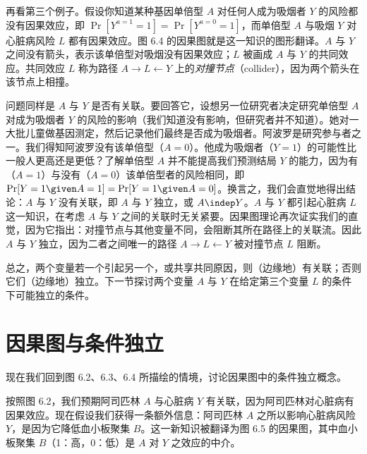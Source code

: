 再看第三个例子。假设你知道某种基因单倍型 $A$ 对任何人成为吸烟者 $Y$ 的风险都没有因果效应，即 $\Pr[Y^{a=1}=1]=\Pr[Y^{a=0}=1]$，而单倍型 $A$ 与吸烟 $Y$ 对心脏病风险 $L$ 都有因果效应。图 6.4 的因果图就是这一知识的图形翻译。$A$ 与 $Y$ 之间没有箭头，表示该单倍型对吸烟没有因果效应；$L$ 被画成 $A$ 与 $Y$ 的共同效应。共同效应 $L$ 称为路径 $A\to L\leftarrow Y$ 上的\emph{对撞节点}（collider），因为两个箭头在该节点上相撞。

\begin{figure}[htbp]
\centering
{}
\caption{}
\label{fig:6.4}
\end{figure}

问题同样是 $A$ 与 $Y$ 是否有关联。要回答它，设想另一位研究者决定研究单倍型 $A$ 对成为吸烟者 $Y$ 的风险的影响（我们知道没有影响，但研究者并不知道）。她对一大批儿童做基因测定，然后记录他们最终是否成为吸烟者。阿波罗是研究参与者之一。我们得知阿波罗没有该单倍型（$A=0$）。他成为吸烟者（$Y=1$）的可能性比一般人更高还是更低？了解单倍型 $A$ 并不能提高我们预测结局 $Y$ 的能力，因为有（$A=1$）与没有（$A=0$）该单倍型者的风险相同，即 $\Pr[Y=1\given A=1]=\Pr[Y=1\given A=0]$。换言之，我们会直觉地得出结论：$A$ 与 $Y$ 没有关联，即 $A$ 与 $Y$ 独立，或 $A\indep Y$。$A$ 与 $Y$ 都引起心脏病 $L$ 这一知识，在考虑 $A$ 与 $Y$ 之间的关联时无关紧要。因果图理论再次证实我们的直觉，因为它指出：对撞节点与其他变量不同，会阻断其所在路径上的关联流。因此 $A$ 与 $Y$ 独立，因为二者之间唯一的路径 $A\to L\leftarrow Y$ 被对撞节点 $L$ 阻断。

总之，两个变量若一个引起另一个，或共享共同原因，则（边缘地）有关联；否则它们（边缘地）独立。下一节探讨两个变量 $A$ 与 $Y$ 在给定第三个变量 $L$ 的条件下可能独立的条件。

\section{因果图与条件独立}

现在我们回到图 6.2、6.3、6.4 所描绘的情境，讨论因果图中的条件独立概念。

按照图 6.2，我们预期阿司匹林 $A$ 与心脏病 $Y$ 有关联，因为阿司匹林对心脏病有因果效应。现在假设我们获得一条额外信息：阿司匹林 $A$ 之所以影响心脏病风险 $Y$，是因为它降低血小板聚集 $B$。这一新知识被翻译为图 6.5 的因果图，其中血小板聚集 $B$（1：高，0：低）是 $A$ 对 $Y$ 之效应的中介。

